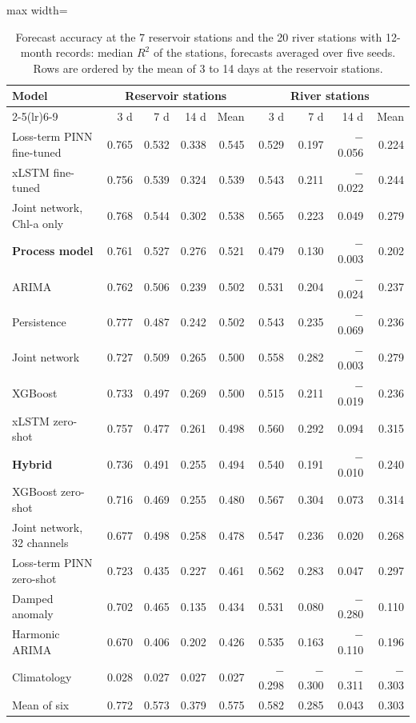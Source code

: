 \begin{table}[tbp]
\centering
\caption{Forecast accuracy at the 7 reservoir stations and the 20 river stations with 12-month records: median $R^2$ of the stations, forecasts averaged over five seeds. Rows are ordered by the mean of 3 to 14 days at the reservoir stations.}
\label{tab:S_by_type12}
\footnotesize
\setlength{\tabcolsep}{4pt}
\begin{adjustbox}{max width=\textwidth}
\begin{tabular}{lrrrrrrrr}
\toprule
Model & \multicolumn{4}{c}{Reservoir stations} & \multicolumn{4}{c}{River stations} \\ \cmidrule(lr){2-5}\cmidrule(lr){6-9}
 & 3 d & 7 d & 14 d & Mean & 3 d & 7 d & 14 d & Mean \\
\midrule
Loss-term PINN fine-tuned & 0.765 & 0.532 & 0.338 & 0.545 & 0.529 & 0.197 & $-$0.056 & 0.224 \\
xLSTM fine-tuned & 0.756 & 0.539 & 0.324 & 0.539 & 0.543 & 0.211 & $-$0.022 & 0.244 \\
Joint network, Chl-a only & 0.768 & 0.544 & 0.302 & 0.538 & 0.565 & 0.223 & 0.049 & 0.279 \\
\textbf{Process model} & 0.761 & 0.527 & 0.276 & 0.521 & 0.479 & 0.130 & $-$0.003 & 0.202 \\
ARIMA & 0.762 & 0.506 & 0.239 & 0.502 & 0.531 & 0.204 & $-$0.024 & 0.237 \\
Persistence & 0.777 & 0.487 & 0.242 & 0.502 & 0.543 & 0.235 & $-$0.069 & 0.236 \\
Joint network & 0.727 & 0.509 & 0.265 & 0.500 & 0.558 & 0.282 & $-$0.003 & 0.279 \\
XGBoost & 0.733 & 0.497 & 0.269 & 0.500 & 0.515 & 0.211 & $-$0.019 & 0.236 \\
xLSTM zero-shot & 0.757 & 0.477 & 0.261 & 0.498 & 0.560 & 0.292 & 0.094 & 0.315 \\
\textbf{Hybrid} & 0.736 & 0.491 & 0.255 & 0.494 & 0.540 & 0.191 & $-$0.010 & 0.240 \\
XGBoost zero-shot & 0.716 & 0.469 & 0.255 & 0.480 & 0.567 & 0.304 & 0.073 & 0.314 \\
Joint network, 32 channels & 0.677 & 0.498 & 0.258 & 0.478 & 0.547 & 0.236 & 0.020 & 0.268 \\
Loss-term PINN zero-shot & 0.723 & 0.435 & 0.227 & 0.461 & 0.562 & 0.283 & 0.047 & 0.297 \\
Damped anomaly & 0.702 & 0.465 & 0.135 & 0.434 & 0.531 & 0.080 & $-$0.280 & 0.110 \\
Harmonic ARIMA & 0.670 & 0.406 & 0.202 & 0.426 & 0.535 & 0.163 & $-$0.110 & 0.196 \\
Climatology & 0.028 & 0.027 & 0.027 & 0.027 & $-$0.298 & $-$0.300 & $-$0.311 & $-$0.303 \\
\midrule
Mean of six & 0.772 & 0.573 & 0.379 & 0.575 & 0.582 & 0.285 & 0.043 & 0.303 \\
\bottomrule
\end{tabular}
\end{adjustbox}
\end{table}
